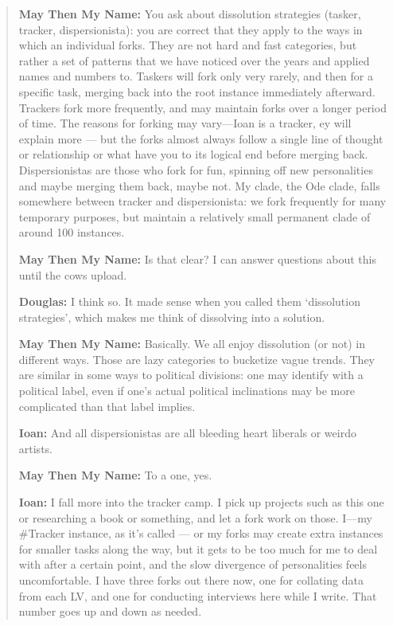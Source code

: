 \begin{quote}
\textbf{May Then My Name:} You ask about dissolution strategies (tasker, tracker, dispersionista): you are correct that they apply to the ways in which an individual forks. They are not hard and fast categories, but rather a set of patterns that we have noticed over the years and applied names and numbers to. Taskers will fork only very rarely, and then for a specific task, merging back into the root instance immediately afterward. Trackers fork more frequently, and may maintain forks over a longer period of time. The reasons for forking may vary---Ioan is a tracker, ey will explain more — but the forks almost always follow a single line of thought or relationship or what have you to its logical end before merging back. Dispersionistas are those who fork for fun, spinning off new personalities and maybe merging them back, maybe not. My clade, the Ode clade, falls somewhere between tracker and dispersionista: we fork frequently for many temporary purposes, but maintain a relatively small permanent clade of around 100 instances.

\textbf{May Then My Name:} Is that clear? I can answer questions about this until the cows upload.

\textbf{Douglas:} I think so. It made sense when you called them `dissolution strategies', which makes me think of dissolving into a solution.

\textbf{May Then My Name:} Basically. We all enjoy dissolution (or not) in different ways. Those are lazy categories to bucketize vague trends. They are similar in some ways to political divisions: one may identify with a political label, even if one's actual political inclinations may be more complicated than that label implies.

\textbf{Ioan:} And all dispersionistas are all bleeding heart liberals or weirdo artists.

\textbf{May Then My Name:} To a one, yes.

\textbf{Ioan:} I fall more into the tracker camp. I pick up projects such as this one or researching a book or something, and let a fork work on those. I---my \#Tracker instance, as it's called — or my forks may create extra instances for smaller tasks along the way, but it gets to be too much for me to deal with after a certain point, and the slow divergence of personalities feels uncomfortable. I have three forks out there now, one for collating data from each LV, and one for conducting interviews here while I write. That number goes up and down as needed.


\end{quote}
